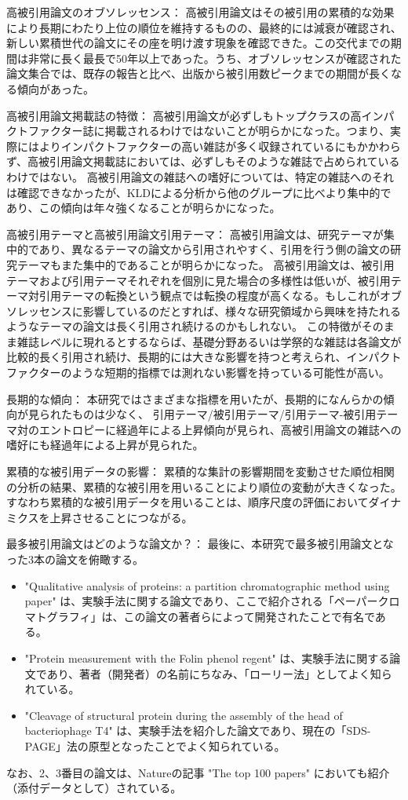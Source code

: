高被引用論文のオブソレッセンス：
高被引用論文はその被引用の累積的な効果により長期にわたり上位の順位を維持するものの、最終的には減衰が確認され、新しい累積世代の論文にその座を明け渡す現象を確認できた。この交代までの期間は非常に長く最長で50年以上であった。うち、オブソレッセンスが確認された論文集合では、既存の報告と比べ、出版から被引用数ピークまでの期間が長くなる傾向があった。

高被引用論文掲載誌の特徴：
高被引用論文が必ずしもトップクラスの高インパクトファクター誌に掲載されるわけではないことが明らかになった。つまり、実際にはよりインパクトファクターの高い雑誌が多く収録されているにもかかわらず、高被引用論文掲載誌においては、必ずしもそのような雑誌で占められているわけではない。
高被引用論文の雑誌への嗜好については、特定の雑誌へのそれは確認できなかったが、KLDによる分析から他のグループに比べより集中的であり、この傾向は年々強くなることが明らかになった。

高被引用テーマと高被引用論文引用テーマ：
高被引用論文は、研究テーマが集中的であり、異なるテーマの論文から引用されやすく、引用を行う側の論文の研究テーマもまた集中的であることが明らかになった。
高被引用論文は、被引用テーマおよび引用テーマそれぞれを個別に見た場合の多様性は低いが、被引用テーマ対引用テーマの転換という観点では転換の程度が高くなる。もしこれがオブソレッセンスに影響しているのだとすれば、様々な研究領域から興味を持たれるようなテーマの論文は長く引用され続けるのかもしれない。
この特徴がそのまま雑誌レベルに現れるとするならば、基礎分野あるいは学祭的な雑誌は各論文が比較的長く引用され続け、長期的には大きな影響を持つと考えられ、インパクトファクターのような短期的指標では測れない影響を持っている可能性が高い。

長期的な傾向：
本研究ではさまざまな指標を用いたが、長期的になんらかの傾向が見られたものは少なく、
引用テーマ/被引用テーマ/引用テーマ-被引用テーマ対のエントロピーに経過年による上昇傾向が見られ、高被引用論文の雑誌への嗜好にも経過年による上昇が見られた。

累積的な被引用データの影響：
累積的な集計の影響期間を変動させた順位相関の分析の結果、累積的な被引用を用いることにより順位の変動が大きくなった。すなわち累積的な被引用データを用いることは、順序尺度の評価においてダイナミクスを上昇させることにつながる。

最多被引用論文はどのような論文か？：
最後に、本研究で最多被引用論文となった3本の論文を俯瞰する。
\begin{itemize}
\item "Qualitative analysis of proteins: a partition chromatographic method using paper" は、実験手法に関する論文であり、ここで紹介される「ペーパークロマトグラフィ」は、この論文の著者らによって開発されたことで有名である。
\item "Protein measurement with the Folin phenol regent" は、実験手法に関する論文であり、著者（開発者）の名前にちなみ、「ローリー法」としてよく知られている。
\item "Cleavage of structural protein during the assembly of the head of bacteriophage T4" は、実験手法を紹介した論文であり、現在の「SDS-PAGE」法の原型となったことでよく知られている。
\end{itemize}
なお、2、3番目の論文は、Natureの記事 "The top 100 papers" \cite{Nor1}においても紹介（添付データとして）されている。
